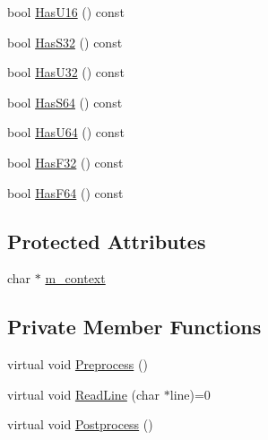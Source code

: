 \begin{DoxyCompactItemize}
\item 
bool \hyperlink{classmage_1_1_line_reader_af2c4d2414dbcaa2edb968725d2cd1555}{Has\+U16} () const
\item 
bool \hyperlink{classmage_1_1_line_reader_ae27570a3d50f3e68f71c334016362e7e}{Has\+S32} () const
\item 
bool \hyperlink{classmage_1_1_line_reader_a81ef171c6511a7b270a5b8d58181715c}{Has\+U32} () const
\item 
bool \hyperlink{classmage_1_1_line_reader_a132804ad3f6a004da5ece8a00cda16f5}{Has\+S64} () const
\item 
bool \hyperlink{classmage_1_1_line_reader_a638e055df8a1850e2e5cb9c91f8c54fc}{Has\+U64} () const
\item 
bool \hyperlink{classmage_1_1_line_reader_a2b2b2719576045b6531a2b8b31c61cee}{Has\+F32} () const
\item 
bool \hyperlink{classmage_1_1_line_reader_a65f4edadd232fdd19c7ba9d044c7d2aa}{Has\+F64} () const
\end{DoxyCompactItemize}
\subsection*{Protected Attributes}
\begin{DoxyCompactItemize}
\item 
char $\ast$ \hyperlink{classmage_1_1_line_reader_a2f1cfe313dc89741386178e63a6b8b0c}{m\+\_\+context}
\end{DoxyCompactItemize}
\subsection*{Private Member Functions}
\begin{DoxyCompactItemize}
\item 
virtual void \hyperlink{classmage_1_1_line_reader_a4de135cfb0434be786cfcfd7959031ef}{Preprocess} ()
\item 
virtual void \hyperlink{classmage_1_1_line_reader_acfb2f7279ec77d070a86d7db812d4745}{Read\+Line} (char $\ast$line)=0
\item 
virtual void \hyperlink{classmage_1_1_line_reader_adfde21013140a1058d3dd567204abfb5}{Postprocess} ()
\end{DoxyCompactItemize}
